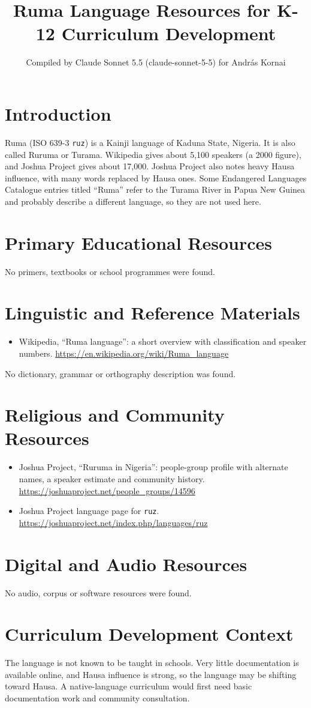 \documentclass[12pt]{article}
\title{Ruma Language Resources for K-12 Curriculum Development}
\author{Compiled by Claude Sonnet 5.5 (claude-sonnet-5-5) for Andr\'as Kornai}
\date{}
\begin{document}
\maketitle

\section{Introduction}
Ruma (ISO 639-3 \texttt{ruz}) is a Kainji language of Kaduna State, Nigeria. It is also called Ruruma or Turama. Wikipedia gives about 5,100 speakers (a 2000 figure), and Joshua Project gives about 17,000. Joshua Project also notes heavy Hausa influence, with many words replaced by Hausa ones. Some Endangered Languages Catalogue entries titled ``Ruma'' refer to the Turama River in Papua New Guinea and probably describe a different language, so they are not used here.

\section{Primary Educational Resources}
No primers, textbooks or school programmes were found.

\section{Linguistic and Reference Materials}
\begin{itemize}
\item Wikipedia, ``Ruma language'': a short overview with classification and speaker numbers. \url{https://en.wikipedia.org/wiki/Ruma_language}
\end{itemize}
No dictionary, grammar or orthography description was found.

\section{Religious and Community Resources}
\begin{itemize}
\item Joshua Project, ``Ruruma in Nigeria'': people-group profile with alternate names, a speaker estimate and community history. \url{https://joshuaproject.net/people_groups/14596}
\item Joshua Project language page for \texttt{ruz}. \url{https://joshuaproject.net/index.php/languages/ruz}
\end{itemize}

\section{Digital and Audio Resources}
No audio, corpus or software resources were found.

\section{Curriculum Development Context}
The language is not known to be taught in schools. Very little documentation is available online, and Hausa influence is strong, so the language may be shifting toward Hausa. A native-language curriculum would first need basic documentation work and community consultation.
\end{document}

